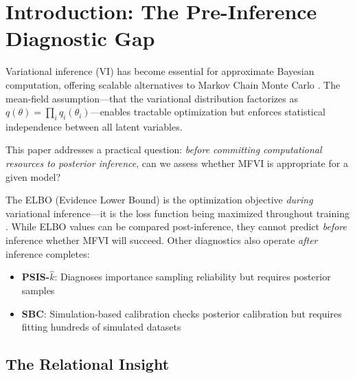 \documentclass[10pt]{article} %
\theoremstyle{plain}
\theoremstyle{definition}
\begin{document}
\begin{abstract}
Validation spans stochastic volatility filters ($r = 0.86$ for log-likelihood gap, $N = 8{,}000$), hierarchical linear models, and three-layer hierarchies ($N = 32{,}000$+ total), yielding a practical pre-inference workflow. The relational theory clarifies a fundamental asymmetry: \emph{what you can learn} from a relationship (inference) depends only on coupling strength, while \emph{what you can do} through a relationship (control) depends on both coupling and scale.
\end{abstract}

\section{Introduction: The Pre-Inference Diagnostic Gap}
\label{sec:intro}

Variational inference (VI) has become essential for approximate Bayesian computation, offering scalable alternatives to Markov Chain Monte Carlo \citep{blei2017variational}. The mean-field assumption---that the variational distribution factorizes as $q(\theta) = \prod_i q_i(\theta_i)$---enables tractable optimization but enforces statistical independence between all latent variables.

This paper addresses a practical question: \emph{before committing computational resources to posterior inference}, can we assess whether MFVI is appropriate for a given model?

The ELBO (Evidence Lower Bound) is the optimization objective \emph{during} variational inference---it is the loss function being maximized throughout training \citep{blei2017variational}. While ELBO values can be compared post-inference, they cannot predict \emph{before} inference whether MFVI will succeed. Other diagnostics also operate \emph{after} inference completes:
\begin{itemize}
    \item \textbf{PSIS-$\hat{k}$}: Diagnoses importance sampling reliability but requires posterior samples \citep{vehtari2017practical}
    \item \textbf{SBC}: Simulation-based calibration checks posterior calibration but requires fitting hundreds of simulated datasets \citep{talts2018validating}
\end{itemize}

\subsection{The Relational Insight}
\end{document}

